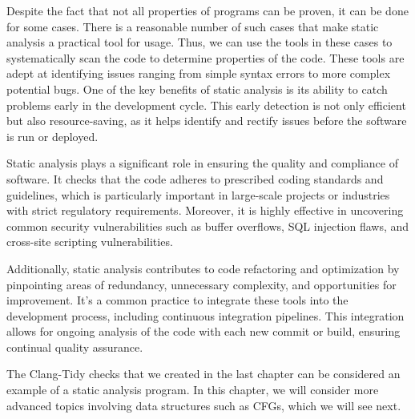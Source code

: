 Despite the fact that not all properties of programs can be proven, it can be done for some cases. There is a reasonable number of such cases that make static analysis a practical tool for usage. Thus, we can use the tools in these cases to systematically scan the code to determine properties of the code. These tools are adept at identifying issues ranging from simple syntax errors to more complex potential bugs. One of the key benefits of static analysis is its ability to catch problems early in the development cycle. This early detection is not only efficient but also resource-saving, as it helps identify and rectify issues before the software is run or deployed.

Static analysis plays a significant role in ensuring the quality and compliance of software. It checks that the code adheres to prescribed coding standards and guidelines, which is particularly important in large-scale projects or industries with strict regulatory requirements. Moreover, it is highly effective in uncovering common security vulnerabilities such as buffer overflows, SQL injection flaws, and cross-site scripting vulnerabilities.

Additionally, static analysis contributes to code refactoring and optimization by pinpointing areas of redundancy, unnecessary complexity, and opportunities for improvement. It's a common practice to integrate these tools into the development process, including continuous integration pipelines. This integration allows for ongoing analysis of the code with each new commit or build, ensuring continual quality assurance.

The Clang-Tidy checks that we created in the last chapter can be considered an example of a static analysis program. In this chapter, we will consider more advanced topics involving data structures such as CFGs, which we will see next.
